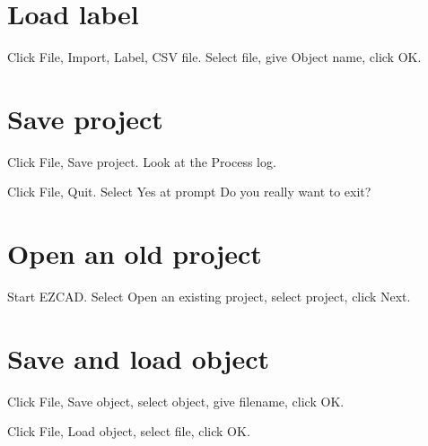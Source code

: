 \documentclass[12pt]{article}
\begin{document}
\section{Load label}

Click \textsf{File}, \textsf{Import}, \textsf{Label}, \textsf{CSV file}.
Select file, give \textsf{Object name}, click \textsf{OK}.

\section{Save project}

Click \textsf{File}, \textsf{Save project}. Look at the \textsf{Process log}.

Click \textsf{File}, \textsf{Quit}. Select \textsf{Yes} at prompt \textsf{
Do you really want to exit?}

\section{Open an old project}

Start EZCAD. Select \textsf{Open an existing project}, select project, click \textsf{Next}.

\section{Save and load object}

Click \textsf{File}, \textsf{Save object}, select object, give filename,
click \textsf{OK}.

Click \textsf{File}, \textsf{Load object}, select file, click \textsf{OK}.
\end{document}

